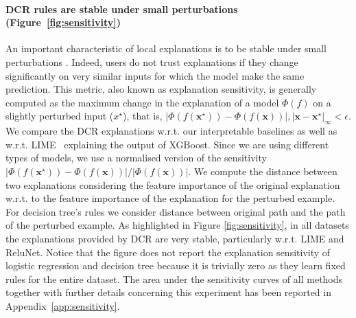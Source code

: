 \paragraph{
DCR rules are stable under small perturbations (Figure~\ref{fig:sensitivity})}
An important characteristic of local explanations is to be stable under small perturbations \citep{yeh2019fidelity}. Indeed, users do not trust explanations if they change significantly on very similar inputs for which the model make the same prediction. This metric, also known as explanation sensitivity, is generally computed as the maximum change in the explanation of a model $\Phi(f)$ on a slightly perturbed input ($x^{\star}$), that is, $|\Phi(f(\mathbf{x}^\star)) - \Phi(f(\mathbf{x}))|,  |\mathbf{x}-\mathbf{x}^\star|_\infty< \epsilon$. We compare the DCR explanations w.r.t. our interpretable baselines as well as w.r.t. LIME~\cite{ribeiro2016should} explaining the output of XGBoost. Since we are using different types of models, we use a normalised version of the sensitivity $ |\Phi(f(\mathbf{x}^\star)) - \Phi(f(\mathbf{x}))| / |\Phi(f(\mathbf{x}))|$. 
We compute the distance between two explanations considering the feature importance of the original explanation w.r.t. to the feature importance of the explanation for the perturbed example. For decision tree's rules we consider distance between original path and the path of the perturbed example. 
As highlighted in Figure \ref{fig:sensitivity}, in all datasets the explanations provided by DCR are very stable, particularly w.r.t. LIME and ReluNet. Notice that the figure does not report the explanation sensitivity of logistic regression and decision tree because it is trivially zero as they learn fixed rules for the entire dataset. The area under the sensitivity curves of all methods together with further details concerning this experiment has been reported in Appendix~\ref{app:sensitivity}.

